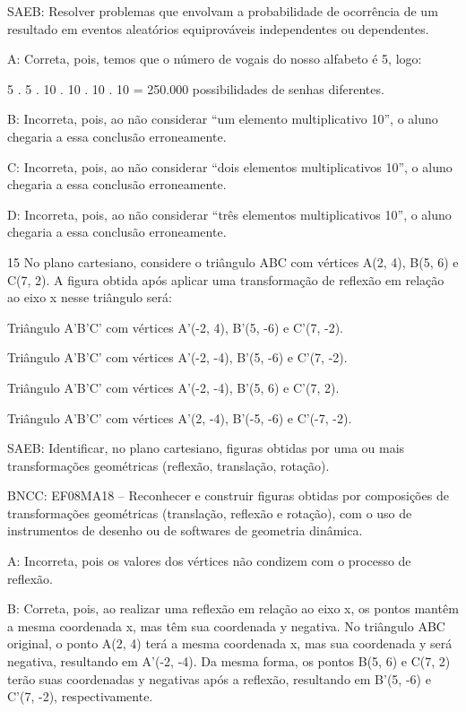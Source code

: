{SAEB: Resolver problemas que envolvam a probabilidade de ocorrência de
um resultado em eventos aleatórios equiprováveis independentes ou
dependentes.

A: Correta, pois, temos que o número de vogais do nosso alfabeto é 5,
logo:

5 . 5 . 10 . 10 . 10 . 10 = 250.000 possibilidades de senhas diferentes.

B: Incorreta, pois, ao não considerar ``um elemento multiplicativo 10'',
o aluno chegaria a essa conclusão erroneamente.

C: Incorreta, pois, ao não considerar ``dois elementos multiplicativos
10'', o aluno chegaria a essa conclusão erroneamente.

D: Incorreta, pois, ao não considerar ``três elementos multiplicativos
10'', o aluno chegaria a essa conclusão erroneamente.

\num{15} No plano cartesiano, considere o triângulo ABC com vértices A(2, 4),
B(5, 6) e C(7, 2). A figura obtida após aplicar uma transformação de
reflexão em relação ao eixo x nesse triângulo será:
\item Triângulo A'B'C' com vértices A'(-2, 4), B'(5, -6) e C'(7, -2).
\item Triângulo A'B'C' com vértices A'(-2, -4), B'(5, -6) e C'(7, -2).
\item Triângulo A'B'C' com vértices A'(-2, -4), B'(5, 6) e C'(7, 2).
\item Triângulo A'B'C' com vértices A'(2, -4), B'(-5, -6) e C'(-7, -2).

SAEB: Identificar, no plano cartesiano, figuras obtidas por uma ou mais
transformações geométricas (reflexão, translação, rotação).

BNCC: EF08MA18 -- Reconhecer e construir figuras obtidas por composições
de transformações geométricas (translação, reflexão e rotação), com o
uso de instrumentos de desenho ou de softwares de geometria dinâmica.

A: Incorreta, pois os valores dos vértices não condizem com o processo
de reflexão.

B: Correta, pois, ao realizar uma reflexão em relação ao eixo x, os
pontos mantêm a mesma coordenada x, mas têm sua coordenada y negativa.
No triângulo ABC original, o ponto A(2, 4) terá a mesma coordenada x,
mas sua coordenada y será negativa, resultando em A'(-2, -4). Da mesma
forma, os pontos B(5, 6) e C(7, 2) terão suas coordenadas y negativas
após a reflexão, resultando em B'(5, -6) e C'(7, -2), respectivamente.

}
